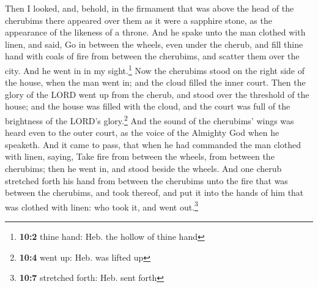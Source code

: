  Then I looked, and, behold, in the firmament that was
above the head of the cherubims there appeared over them as it were a
sapphire stone, as the appearance of the likeness of a throne.
 And he spake unto the man clothed with linen, and said,
Go in between the wheels, even under the cherub, and fill thine hand
with coals of fire from between the cherubims, and scatter them over the
city. And he went in in my sight.\footnote{\textbf{10:2} thine hand:
  Heb. the hollow of thine hand}  Now the cherubims stood
on the right side of the house, when the man went in; and the cloud
filled the inner court.  Then the glory of the LORD went
up from the cherub, and stood over the threshold of the house; and the
house was filled with the cloud, and the court was full of the
brightness of the LORD's glory.\footnote{\textbf{10:4} went up: Heb. was
  lifted up}  And the sound of the cherubims' wings was
heard even to the outer court, as the voice of the Almighty God when he
speaketh.  And it came to pass, that when he had commanded
the man clothed with linen, saying, Take fire from between the wheels,
from between the cherubims; then he went in, and stood beside the
wheels.  And one cherub stretched forth his hand from
between the cherubims unto the fire that was between the cherubims, and
took thereof, and put it into the hands of him that was clothed with
linen: who took it, and went out.\footnote{\textbf{10:7} stretched
  forth: Heb. sent forth}


